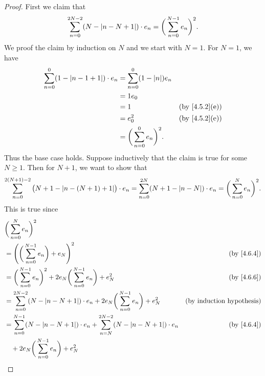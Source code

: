 \begin{proof}
  First we claim that
  \[
    \sum_{n = 0}^{2N - 2} (N - \left\lvert n - N + 1\right\rvert) \cdot e_n = \bigg(\sum_{n = 0}^{N - 1} e_n\bigg)^2.
  \]
  We proof the claim by induction on \(N\) and we start with \(N = 1\).
  For \(N = 1\), we have
  \begin{align*}
    \sum_{n = 0}^0 (1 - \abs{n - 1 + 1}) \cdot e_n & = \sum_{n = 0}^0 (1 - \abs{n}) e_n                                \\
                                                   & = 1 e_0                                                           \\
                                                   & = 1                                 & \text{(by \cref{4.5.2}(e))} \\
                                                   & = e_0^2                             & \text{(by \cref{4.5.2}(e))} \\
                                                   & = \bigg(\sum_{n = 0}^0 e_n\bigg)^2.
  \end{align*}
  Thus the base case holds.
  Suppose inductively that the claim is true for some \(N \geq 1\).
  Then for \(N + 1\), we want to show that
  \[
    \sum_{n = 0}^{2(N + 1) - 2} \big(N + 1 - \abs{n - (N + 1) + 1}\big) \cdot e_n = \sum_{n = 0}^{2N} (N + 1 - \abs{n - N}) \cdot e_n = \bigg(\sum_{n = 0}^N e_n\bigg)^2.
  \]
  This is true since
  \begin{align*}
     & \bigg(\sum_{n = 0}^N e_n\bigg)^2                                                                                                                                  \\
     & = \Bigg(\bigg(\sum_{n = 0}^{N - 1} e_n\bigg) + e_N\Bigg)^2                                                                     & \text{(by \cref{4.6.4})}         \\
     & = \bigg(\sum_{n = 0}^{N - 1} e_n\bigg)^2 + 2 e_N \bigg(\sum_{n = 0}^{N - 1} e_n\bigg) + e_N^2                                  & \text{(by \cref{4.6.6})}         \\
     & = \sum_{n = 0}^{2N - 2} (N - \abs{n - N + 1}) \cdot e_n + 2 e_N \bigg(\sum_{n = 0}^{N - 1} e_n\bigg) + e_N^2                   & \text{(by induction hypothesis)} \\
     & = \sum_{n = 0}^{N - 1} (N - \abs{n - N + 1}) \cdot e_n + \sum_{n = N}^{2N - 2} (N - \abs{n - N + 1}) \cdot e_n                 & \text{(by \cref{4.6.4})}         \\
     & \quad + 2 e_N \bigg(\sum_{n = 0}^{N - 1} e_n\bigg) + e_N^2                                                                                                        \\

\end{align*}
\end{proof}
